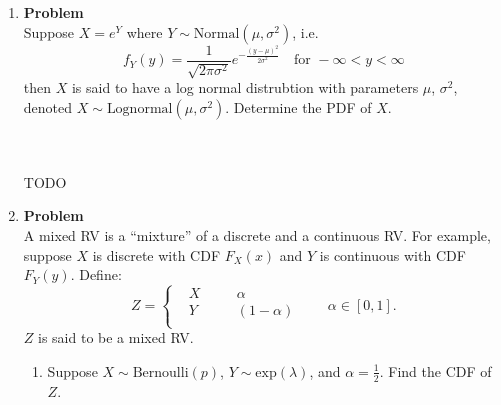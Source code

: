 \documentclass[12pt]{article}
\newenvironment{Ex}{\textbf{Problem}\vspace{.75em}\\}{}
\begin{document}
\begin{enumerate}
\begin{Ex}
\begin{enumerate}
    \item Find $E[T]$ and $\text{Var}(T)$. You should find expressions
      in terms of $p_i$ and $\alpha_i$, where $i = 1,\ldots,n$
    \item Suppose $T > 5$. Find an expression for the probability that
      clerk $i$ served the customer. Hint: You will need to use a
      version of Bayes Rule.
    \end{enumerate}
    \begin{solution} \hfill \\\\ {\huge TODO}
    \end{solution}
  \end{Ex}
\item
  \begin{Ex}
    Suppose $X = e^Y$ where $Y\sim \text{Normal}(\mu, \sigma^2)$, i.e.
    \begin{equation}
      \label{eq:5-question}
      f_Y(y) =
      \frac{1}{\sqrt{2\pi\sigma^2}}e^{-\frac{(y-\mu)^2}{2\sigma^2}}
      \quad\text{for }-\infty < y < \infty
    \end{equation}
    then $X$ is said to have a log normal distrubtion with parameters
    $\mu$, $\sigma^2$, denoted $X \sim
    \text{Lognormal}(\mu,\sigma^2)$. Determine the PDF of $X$.
    \begin{solution} \hfill \\\\ {\huge TODO}
    \end{solution}
  \end{Ex}
\item
  \begin{Ex}
    A mixed RV is a ``mixture'' of a discrete and a continuous RV. For
    example, suppose $X$ is discrete with CDF $F_X(x)$ and $Y$ is
    continuous with CDF $F_Y(y)$. Define:
    \begin{equation}
      \label{eq:6-question}
      Z = \left\{
        \begin{aligned}
          & X &&\quad \alpha \\
          & Y &&\quad (1-\alpha) \\
        \end{aligned} \right.
      \quad\quad\alpha \in [0,1].
    \end{equation}
    $Z$ is said to be a mixed RV.
    \begin{enumerate}
    \item Suppose $X \sim \text{Bernoulli}(p)$, $Y\sim
      \text{exp}(\lambda)$, and $\alpha=\frac{1}{2}$. Find the CDF of
      $Z$.


\end{enumerate}
\end{Ex}
\end{enumerate}
\end{document}
